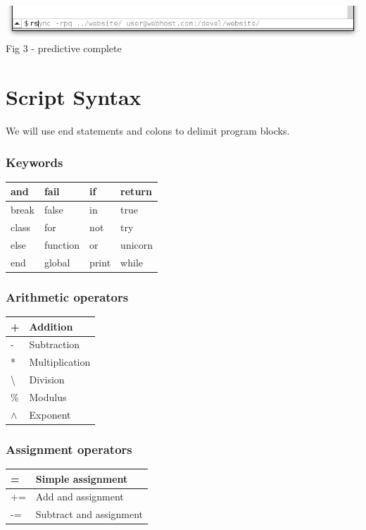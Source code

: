 \documentclass[a4paper,12pt]{article}
\begin{document}
\begin{center}
  \includegraphics[width=14cm]{autocomplete.png}\\
  \small Fig 3 - predictive complete
\end{center}

\pagebreak
\section*{Script Syntax}

We will use end statements and colons to delimit program blocks.

\begin{multicols}{2}

  \subsubsection*{Keywords}
  \begin{tabular}{| l | l | l | l | } \hline
    and & fail & if & return \\ \hline
    break & false & in & true \\ \hline
    class & for & not & try \\ \hline
    else & function & or & unicorn \\ \hline
    end & global &  print & while \\ \hline
  \end{tabular}

  \subsubsection*{Arithmetic operators}
  \begin{tabular}{| l | l | } \hline
    + & Addition \\ \hline
    - & Subtraction \\ \hline
    * & Multiplication \\ \hline
    \textbackslash & Division \\ \hline
    \% & Modulus \\ \hline
    \(\wedge\)  & Exponent \\ \hline
  \end{tabular}

  \subsubsection*{Assignment operators}
  \begin{tabular}{| l | l | } \hline
    = & Simple assignment  \\ \hline
    += & Add and assignment  \\ \hline
    -= & Subtract and assignment  \\ \hline
  \end{tabular}


\end{multicols}
\end{document}
